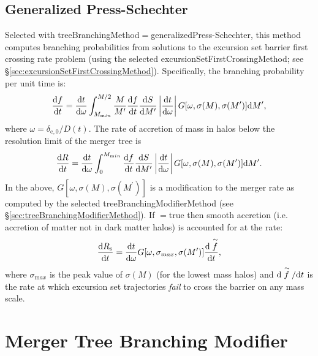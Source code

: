 \subsection{Generalized Press-Schechter}

Selected with {\normalfont \ttfamily treeBranchingMethod}$=${\normalfont \ttfamily generalizedPress-Schechter}, this method computes branching probabilities from solutions to the excursion set barrier first crossing rate problem (using the selected {\normalfont \ttfamily excursionSetFirstCrossingMethod}; see \S\ref{sec:excursionSetFirstCrossingMethod}). Specifically, the branching probability per unit time is:
\begin{equation}
 {\d f \over \d t} = {{\mathrm d} t \over {\mathrm d}\omega} \int_{M_{\mathrm min}}^{M/2} {M \over M^\prime} {\d f \over \d t} {\d S \over \d M^\prime} \left| {\d t \over \d \omega}\right| G[\omega,\sigma(M),\sigma(M^\prime)] \d M^\prime,
\end{equation}
where $\omega = \delta_{\mathrm c,0}/D(t)$. The rate of accretion of mass in halos below the resolution limit of the merger tree is
\begin{equation}
 {\d R \over \d t} =  {{\mathrm d} t \over {\mathrm d}\omega} \int_0^{M_{\mathrm min}} {\d f \over \d t} {\d S \over \d M^\prime} \left| {\d t \over \d \omega}\right| G[\omega,\sigma(M),\sigma(M^\prime)] \d M^\prime.
\end{equation}
In the above, $G[\omega,\sigma(M),\sigma(M^\prime)]$ is a modification to the merger rate as computed by the selected {\normalfont \ttfamily treeBranchingModifierMethod} (see \S\ref{sec:treeBranchingModifierMethod}). If {\normalfont \ttfamily [generalizedPressSchechterSmoothAccretion]}$=${\normalfont \ttfamily true} then smooth accretion (i.e. accretion of matter not in dark matter halos) is accounted for at the rate:
\begin{equation}
 {\d R_{\mathrm s} \over \d t} =  {{\mathrm d} t \over {\mathrm d}\omega} G[\omega,\sigma_{\mathrm max},\sigma(M^\prime)] {\d \stackrel{\sim}{f} \over \d t},
\end{equation}
where $\sigma_{\mathrm max}$ is the peak value of $\sigma(M)$ (for the lowest mass halos) and $\d \stackrel{\sim}{f}/\d t$ is the rate at which excursion set trajectories \emph{fail} to cross the barrier on any mass scale.


\section{Merger Tree Branching Modifier}

